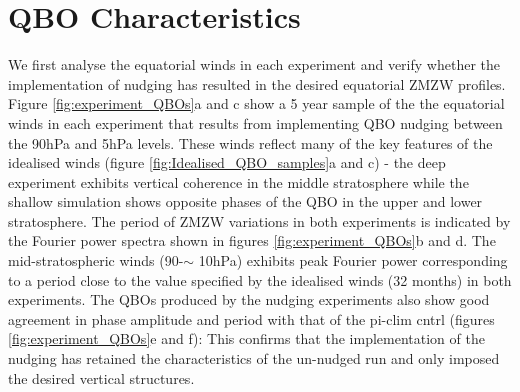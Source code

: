 \section{QBO Characteristics}
We first analyse the equatorial winds in each experiment and verify whether the implementation of nudging has resulted in the desired equatorial ZMZW profiles. Figure \ref{fig:experiment_QBOs}a and c show a 5 year sample of the the equatorial winds in each experiment that results from implementing QBO nudging between the 90hPa and 5hPa levels. These winds reflect many of the key features of the idealised winds (figure \ref{fig:Idealised_QBO_samples}a and c) - the deep experiment exhibits vertical coherence in the middle stratosphere while the shallow simulation shows opposite phases of the QBO in the upper and lower stratosphere. The period of ZMZW variations in both experiments is indicated by the Fourier power spectra shown in figures \ref{fig:experiment_QBOs}b and d. The mid-stratospheric winds (90-$\sim$ 10hPa) exhibits peak Fourier power corresponding to a period close to the value specified by the idealised winds (32 months) in both experiments. The QBOs produced by the nudging experiments also show good agreement in phase amplitude and period with that of the pi-clim cntrl (figures \ref{fig:experiment_QBOs}e and f): This confirms that the implementation of the nudging has retained the characteristics of the un-nudged run and only imposed the desired vertical structures.

